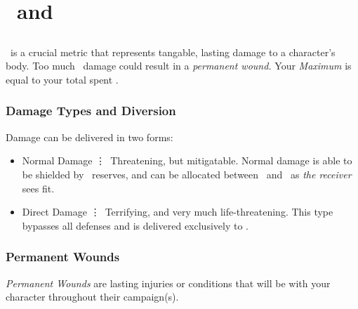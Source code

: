 
\chapter{\HPful\ and \ENful}\label{ch:hp_and_en}
\section{\HPful\index{\HPful}}\label{sec:hp}
\HPful\ is a crucial metric that represents tangable, lasting damage to a character's body. Too much \HPful\ damage could result in a
\textit{permanent wound.} Your \emph{Maximum \HPful} is equal to your total spent \attrval{}.


\subsection{Damage Types and Diversion}\label{subsec:damage_types}
Damage can be delivered in two forms:
\begin{itemize}
	\item Normal Damage \vdots\ Threatening, but mitigatable. Normal damage is able to be shielded by \ENful\ reserves, and can be allocated between \HPful\ and \ENful\ as \emph{the receiver} sees fit.
	\item Direct Damage \vdots\ Terrifying, and very much life-threatening. This type bypasses all defenses and is delivered exclusively to \HPful .
\end{itemize}

\subsection{Permanent Wounds}\label{subsec:wounds}
\emph{Permanent Wounds} are lasting injuries or conditions that will be with your character throughout their campaign(s).

